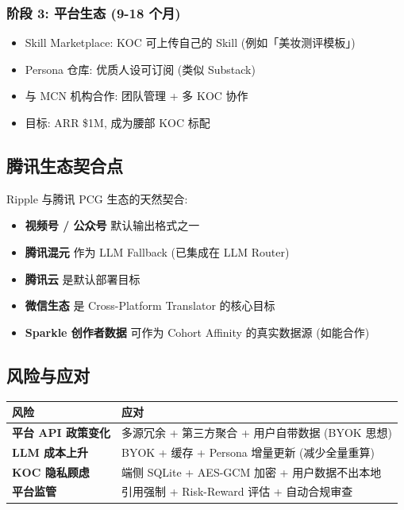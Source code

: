 \subsubsection{阶段 3: 平台生态 (9-18 个月)}

\begin{itemize}
    \item Skill Marketplace: KOC 可上传自己的 Skill (例如「美妆测评模板」)
    \item Persona 仓库: 优质人设可订阅 (类似 Substack)
    \item 与 MCN 机构合作: 团队管理 + 多 KOC 协作
    \item 目标: ARR \$1M, 成为腰部 KOC 标配
\end{itemize}

\subsection{腾讯生态契合点}

\begin{insight}
Ripple 与腾讯 PCG 生态的天然契合:

\begin{itemize}
    \item \textbf{视频号 / 公众号} 默认输出格式之一
    \item \textbf{腾讯混元} 作为 LLM Fallback (已集成在 LLM Router)
    \item \textbf{腾讯云} 是默认部署目标
    \item \textbf{微信生态} 是 Cross-Platform Translator 的核心目标
    \item \textbf{Sparkle 创作者数据} 可作为 Cohort Affinity 的真实数据源 (如能合作)
\end{itemize}
\end{insight}

\subsection{风险与应对}

\begin{tabularx}{\textwidth}{>{\bfseries}l X}
    \toprule
    风险 & 应对 \\
    \midrule
    平台 API 政策变化 & 多源冗余 + 第三方聚合 + 用户自带数据 (BYOK 思想) \\
    \midrule
    LLM 成本上升 & BYOK + 缓存 + Persona 增量更新 (减少全量重算) \\
    \midrule
    KOC 隐私顾虑 & 端侧 SQLite + AES-GCM 加密 + 用户数据不出本地 \\
    \midrule
    平台监管 & 引用强制 + Risk-Reward 评估 + 自动合规审查 \\
    \bottomrule
\end{tabularx}
